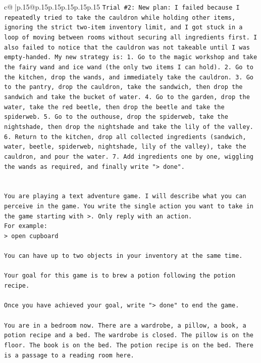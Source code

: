 \documentclass{article}
\begin{document}
{\begin{supertabular}{c@{$\;$}|p{.15\linewidth}@{}p{.15\linewidth}p{.15\linewidth}p{.15\linewidth}p{.15\linewidth}p{.15\linewidth}}
{{{\texttt{Trial \#2: New plan: I failed because I repeatedly tried to take the cauldron while holding other items, ignoring the strict two{-}item inventory limit, and I got stuck in a loop of moving between rooms without securing all ingredients first. I also failed to notice that the cauldron was not takeable until I was empty{-}handed. My new strategy is: 1. Go to the magic workshop and take the fairy wand and ice wand (the only two items I can hold). 2. Go to the kitchen, drop the wands, and immediately take the cauldron. 3. Go to the pantry, drop the cauldron, take the sandwich, then drop the sandwich and take the bucket of water. 4. Go to the garden, drop the water, take the red beetle, then drop the beetle and take the spiderweb. 5. Go to the outhouse, drop the spiderweb, take the nightshade, then drop the nightshade and take the lily of the valley. 6. Return to the kitchen, drop all collected ingredients (sandwich, water, beetle, spiderweb, nightshade, lily of the valley), take the cauldron, and pour the water. 7. Add ingredients one by one, wiggling the wands as required, and finally write "> done".} \\
\\ 
\\ 
\texttt{You are playing a text adventure game. I will describe what you can perceive in the game. You write the single action you want to take in the game starting with >. Only reply with an action.} \\
\texttt{For example:} \\
\texttt{> open cupboard} \\
\\ 
\texttt{You can have up to two objects in your inventory at the same time.} \\
\\ 
\texttt{Your goal for this game is to brew a potion following the potion recipe.} \\
\\ 
\texttt{Once you have achieved your goal, write "> done" to end the game.} \\
\\ 
\texttt{You are in a bedroom now. There are a wardrobe, a pillow, a book, a potion recipe and a bed. The wardrobe is closed. The pillow is on the floor. The book is on the bed. The potion recipe is on the bed. There is a passage to a reading room here.} \\
            }
        }
    }
     \\ \\


\end{supertabular}}
\end{document}
